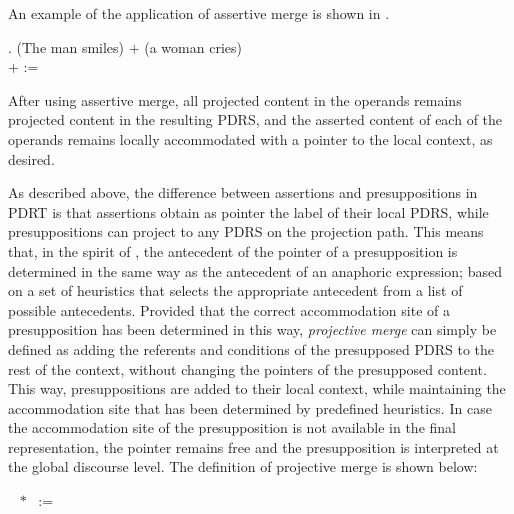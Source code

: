 An example of the application of assertive merge is shown in \Next.

\ex. (The man smiles) $+$ (a woman cries)\\
{\small
{} 
  $+$ 
  := 
}

After using assertive merge, all projected content in the operands remains
projected content in the resulting PDRS, and the asserted content of each of
the operands remains locally accommodated with a pointer to the local
context, as desired.

As described above, the difference between assertions and presuppositions in
PDRT is that assertions obtain as pointer the label of their local PDRS,
while presuppositions can project to any PDRS on the projection path. This
means that, in the spirit of \citet{sandt1992presupposition}, the antecedent
of the pointer of a presupposition is determined in the same way as the
antecedent of an anaphoric expression; based on a set of heuristics that
selects the appropriate antecedent from a list of possible antecedents.
Provided that the correct accommodation site of a presupposition has been
determined in this way, \emph{projective merge} can simply be defined as
adding the referents and conditions of the presupposed PDRS to the rest of
the context, without changing the pointers of the presupposed content. This
way, presuppositions are added to their local context, while maintaining the
accommodation site that has been determined by predefined heuristics. In
case the accommodation site of the presupposition is not available in the
final representation, the pointer remains free and the presupposition is
interpreted at the global discourse level. 
The definition of projective merge is shown below:

\begin{definition} 
  {\small ~ $\ast$ 
   \ := \ 
 }
\end{definition}

